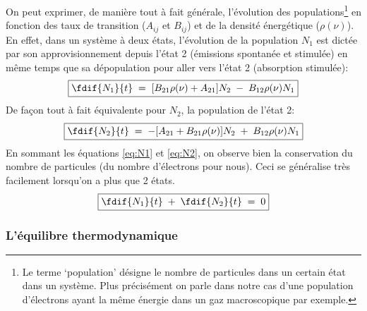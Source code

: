 On peut exprimer, de manière tout à fait générale, l'évolution des populations\footnote{Le terme `population' désigne le nombre de particules dans un certain état dans un système. Plus précisément on parle dans notre cas d'une population d'électrons ayant la même énergie dans un gaz macroscopique par exemple.} en fonction des taux de transition ($A_{ij}$ et $B_{ij}$) et de la densité énergétique ($\rho(\nu)$).\\
En effet, dans un système à deux états, l'évolution de la population $N_1$ est dictée par son approvisionnement depuis l'état 2 (émissions spontanée et stimulée) en même temps que sa dépopulation pour aller vers l'état 2 (absorption stimulée):
\begin{equation}
\boxed{
    \fdif{N_1}{t}
    \eq  [B_{21}\rho(\nu) + A_{21}]N_2 \;-\; B_{12} \rho(\nu)N_1
    }
    \label{eq:N2}
\end{equation}
De façon tout à fait équivalente pour $N_2$, la population de l'état 2:
\begin{equation}
\boxed{
    \fdif{N_2}{t}
    \eq - [A_{21} + B_{21} \rho(\nu)]N_2 \;+\; B_{12}\rho(\nu)N_1
    \label{eq:N1}
    }
\end{equation}
En sommant les équations \ref{eq:N1} et \ref{eq:N2}, on observe bien la conservation du nombre de particules (du nombre d'électrons pour nous). Ceci se généralise très facilement lorsqu'on a plus que 2 états.
\begin{equation}
\boxed{
    \fdif{N_1}{t}\;+\;\fdif{N_2}{t} \eq 0
    }
\end{equation}



\subsubsection{L'équilibre thermodynamique}




